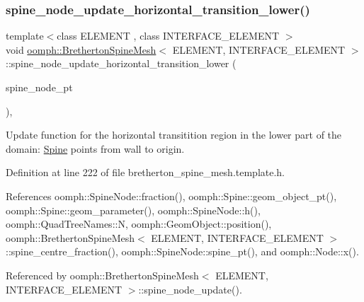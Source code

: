 \subsubsection{\texorpdfstring{spine\+\_\+node\+\_\+update\+\_\+horizontal\+\_\+transition\+\_\+lower()}{spine\_node\_update\_horizontal\_transition\_lower()}}
{\footnotesize\ttfamily template$<$class E\+L\+E\+M\+E\+NT , class I\+N\+T\+E\+R\+F\+A\+C\+E\+\_\+\+E\+L\+E\+M\+E\+NT $>$ \\
void \hyperlink{classoomph_1_1BrethertonSpineMesh}{oomph\+::\+Bretherton\+Spine\+Mesh}$<$ E\+L\+E\+M\+E\+NT, I\+N\+T\+E\+R\+F\+A\+C\+E\+\_\+\+E\+L\+E\+M\+E\+NT $>$\+::spine\+\_\+node\+\_\+update\+\_\+horizontal\+\_\+transition\+\_\+lower (\begin{DoxyParamCaption}\item[{\hyperlink{classoomph_1_1SpineNode}{Spine\+Node} $\ast$}]{spine\+\_\+node\+\_\+pt }\end{DoxyParamCaption})\hspace{0.3cm}{\ttfamily [inline]}, {\ttfamily [protected]}}



Update function for the horizontal transitition region in the lower part of the domain\+: \hyperlink{classoomph_1_1Spine}{Spine} points from wall to origin. 



Definition at line 222 of file bretherton\+\_\+spine\+\_\+mesh.\+template.\+h.



References oomph\+::\+Spine\+Node\+::fraction(), oomph\+::\+Spine\+::geom\+\_\+object\+\_\+pt(), oomph\+::\+Spine\+::geom\+\_\+parameter(), oomph\+::\+Spine\+Node\+::h(), oomph\+::\+Quad\+Tree\+Names\+::N, oomph\+::\+Geom\+Object\+::position(), oomph\+::\+Bretherton\+Spine\+Mesh$<$ E\+L\+E\+M\+E\+N\+T, I\+N\+T\+E\+R\+F\+A\+C\+E\+\_\+\+E\+L\+E\+M\+E\+N\+T $>$\+::spine\+\_\+centre\+\_\+fraction(), oomph\+::\+Spine\+Node\+::spine\+\_\+pt(), and oomph\+::\+Node\+::x().



Referenced by oomph\+::\+Bretherton\+Spine\+Mesh$<$ E\+L\+E\+M\+E\+N\+T, I\+N\+T\+E\+R\+F\+A\+C\+E\+\_\+\+E\+L\+E\+M\+E\+N\+T $>$\+::spine\+\_\+node\+\_\+update().

\mbox{\label{classoomph_1_1BrethertonSpineMesh_aa9fa4941d8fb02a388e933a7dd1c76a2}} 

